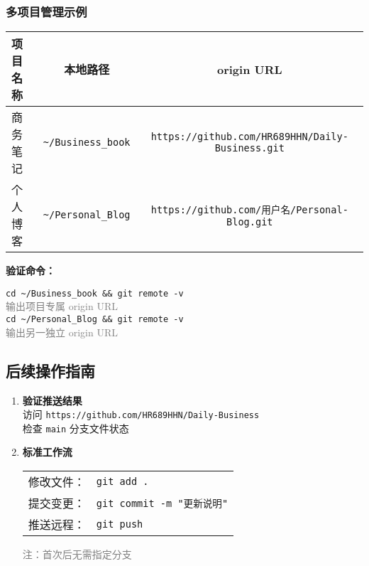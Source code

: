 \subsubsection{多项目管理示例}
\begin{center}
\begin{tabular}{lcc}
    \toprule
    \textbf{项目名称} & \textbf{本地路径} & \textbf{origin URL} \\
    \midrule
    商务笔记 & \texttt{\textasciitilde/Business\_book} & \texttt{https://github.com/HR689HHN/Daily-Business.git} \\
    个人博客 & \texttt{\textasciitilde/Personal\_Blog} & \texttt{https://github.com/用户名/Personal-Blog.git} \\
    \bottomrule
\end{tabular}
\end{center}

\textbf{验证命令：}
\begin{center}
    \texttt{cd \textasciitilde/Business\_book \&\& git remote -v} \\
    \textcolor{gray}{输出项目专属 origin URL} \\[0.5em]
    \texttt{cd \textasciitilde/Personal\_Blog \&\& git remote -v} \\
    \textcolor{gray}{输出另一独立 origin URL}
\end{center}

\subsection{后续操作指南}
\begin{enumerate}[leftmargin=*, nosep]
    \item \textbf{验证推送结果} \\
    访问 \texttt{https://github.com/HR689HHN/Daily-Business} \\
    检查 \texttt{main} 分支文件状态
    
    \item \textbf{标准工作流} \\
    \begin{tabular}{@{}ll@{}}
        修改文件： & \texttt{git add .} \\
        提交变更： & \texttt{git commit -m "更新说明"} \\
        推送远程： & \texttt{git push} \\
    \end{tabular}
    \textcolor{gray}{注：首次后无需指定分支}
\end{enumerate}

